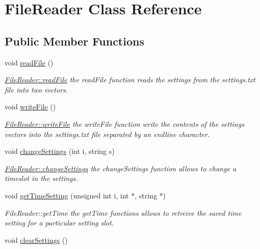 \hypertarget{class_file_reader}{}\section{File\+Reader Class Reference}
\label{class_file_reader}
\subsection*{Public Member Functions}
\begin{DoxyCompactItemize}
\item 
\hypertarget{class_file_reader_a34d1e57721856a4ec1d7f567aa0daf33}{}void \hyperlink{class_file_reader_a34d1e57721856a4ec1d7f567aa0daf33}{read\+File} ()\label{class_file_reader_a34d1e57721856a4ec1d7f567aa0daf33}

\begin{DoxyCompactList}\small\item\em \hyperlink{class_file_reader_a34d1e57721856a4ec1d7f567aa0daf33}{File\+Reader\+::read\+File} the read\+File function reads the settings from the settings.\+txt file into two vectors. \end{DoxyCompactList}\item 
\hypertarget{class_file_reader_a06f1ab4a931d05cb7a038692c4987406}{}void \hyperlink{class_file_reader_a06f1ab4a931d05cb7a038692c4987406}{write\+File} ()\label{class_file_reader_a06f1ab4a931d05cb7a038692c4987406}

\begin{DoxyCompactList}\small\item\em \hyperlink{class_file_reader_a06f1ab4a931d05cb7a038692c4987406}{File\+Reader\+::write\+File} the write\+File function write the contents of the settings vectors into the settings.\+txt file separated by an endline character. \end{DoxyCompactList}\item 
void \hyperlink{class_file_reader_aa8425199182dc7662119c56c43b7d1be}{change\+Settings} (int i, string s)
\begin{DoxyCompactList}\small\item\em \hyperlink{class_file_reader_aa8425199182dc7662119c56c43b7d1be}{File\+Reader\+::change\+Settings} the change\+Settings function allows to change a timeslot in the settings. \end{DoxyCompactList}\item 
void \hyperlink{class_file_reader_a5b8a395b82cb6de5d7de820f15fec86f}{get\+Time\+Setting} (unsigned int i, int $\ast$, string $\ast$)
\begin{DoxyCompactList}\small\item\em File\+Reader\+::get\+Time the get\+Time functions allows to retreive the saved time setting for a particular setting slot. \end{DoxyCompactList}\item 
\hypertarget{class_file_reader_ac310e0d0c40bcb30dcf9cd4e14fcedba}{}void \hyperlink{class_file_reader_ac310e0d0c40bcb30dcf9cd4e14fcedba}{clear\+Settings} ()\label{class_file_reader_ac310e0d0c40bcb30dcf9cd4e14fcedba}


\end{DoxyCompactItemize}
